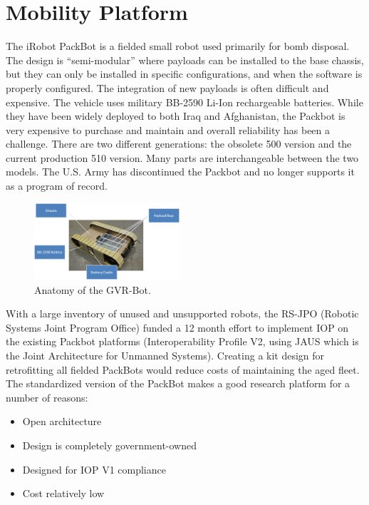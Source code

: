 \section{Mobility Platform}\label{sec:platform}

The iRobot PackBot is a fielded small robot used primarily for bomb disposal. The design is ``semi-modular'' where payloads can be installed to the base chassis, but they can only be installed in specific configurations, and when the software is properly configured. The integration of new payloads is often difficult and expensive. The vehicle uses military BB-2590 Li-Ion rechargeable batteries. While they have been widely deployed to both Iraq and Afghanistan, the Packbot is very expensive to purchase and maintain and overall reliability has been a challenge. There are two different generations: the obsolete 500 version and the current production 510 version. Many parts are interchangeable between the two models. The U.S. Army has discontinued the Packbot and no longer supports it as a program of record.

\begin{figure}
	\centering
	\includegraphics[width=0.48\textwidth]{./pictures/packbot.png}
	\caption{Anatomy of the GVR-Bot.}
	\label{fig:packbot}
\end{figure}

With a large inventory of unused and unsupported robots, the RS-JPO (Robotic Systems Joint Program Office) funded a 12 month effort to implement IOP on the existing Packbot platforms (Interoperability Profile V2, using JAUS which is the Joint Architecture for Unmanned Systems). Creating a kit design for retrofitting all fielded PackBots would reduce costs of maintaining the aged fleet. The standardized version of the PackBot makes a good research platform for a number of reasons:
\begin{itemize}
	\item Open architecture
	\item Design is completely government-owned
	\item Designed for IOP V1 compliance
	\item Cost relatively low
\end{itemize}

